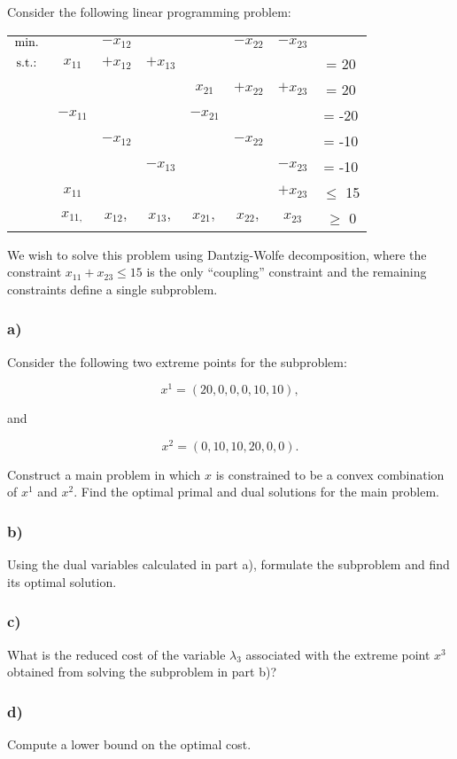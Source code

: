 Consider the following linear programming problem:

\begin{center}
\begin{tabular}{cccccccc}
	 $\mathop{\text{min.~}}	$ 	&   		& $-x_{12}$	& 		& 		& $-x_{22}$	& $-x_{23}$	& 		\\
 	 $\mathop{\text{s.t.:~}} $		& $x_{11}$ 	& $+x_{12}$& $+x_{13}$&		&		&		& = 20   	\\
	 		&		&		&		& $x_{21}$	& $+x_{22}$& $+x_{23}$& = 20   	\\
	 		& $-x_{11}$ 	&		&		& $-x_{21}$	&		& 		& = -20   	\\
			& 		& $-x_{12}$	&		&		& $-x_{22}$	&		& = -10   	\\
			&		&		& $-x_{13}$	&		&		& $-x_{23}$	& = -10   	\\
			& $x_{11}$ 	&		&		& 		& 		& $+x_{23}$& $\le$ 15   	\\
			& $x_{11,}$ 	& $x_{12},$	& $x_{13},$	& $x_{21},$	& $x_{22},$	& $x_{23}$	& $\ge$ 0   	\\
\end{tabular}	
\end{center}

We wish to solve this problem using Dantzig-Wolfe decomposition, where the constraint $x_{11}+x_{23} \le 15$ is the only ``coupling'' constraint and the remaining constraints define a single subproblem.

\subsubsection*{a)}
Consider the following two extreme points for the subproblem:

$$x^1 = (20,0,0,0,10,10),$$

and

$$x^2 = (0,10,10,20,0,0).$$

Construct a main problem in which $x$ is constrained to be a convex combination of $x^1$ and $x^2$. Find the optimal primal and dual solutions for the main problem.

\subsubsection*{b)}

Using the dual variables calculated in part a), formulate the subproblem and find its optimal solution.

\subsubsection*{c)}

What is the reduced cost of the variable $\lambda_3$ associated with the extreme point $x^3$ obtained from solving the subproblem in part b)?

\subsubsection*{d)}

Compute a lower bound on the optimal cost.